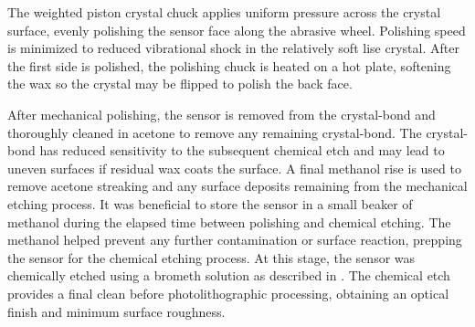 \documentclass[../../../main.tex]{subfiles}
\begin{document}
    The weighted piston crystal chuck applies uniform pressure across the crystal surface, evenly polishing the sensor face along the abrasive wheel.
    Polishing speed is minimized to reduced vibrational shock in the relatively soft \gls{lise} crystal.
    After the first side is polished, the polishing chuck is heated on a hot plate, softening the wax so the crystal may be flipped to polish the back face.
    \par%
    After mechanical polishing, the sensor is removed from the \gls{crystal-bond} and thoroughly cleaned in \gls{acetone} to remove any remaining \gls{crystal-bond}.
    The \gls{crystal-bond} has reduced sensitivity to the subsequent chemical etch and may lead to uneven surfaces if residual wax coats the surface.
    A final \gls{methanol} rise is used to remove \gls{acetone} streaking and any surface deposits remaining from the mechanical etching process.
    It was beneficial to store the sensor in a small beaker of \gls{methanol} during the elapsed time between polishing and chemical etching.
    The \gls{methanol} helped prevent any further contamination or surface reaction, prepping the sensor for the chemical etching process.
    At this stage, the sensor was chemically etched using a \gls{brometh} solution as described in .
    The chemical etch provides a final clean before photolithographic processing, obtaining an optical finish and minimum surface roughness.
\end{document}
